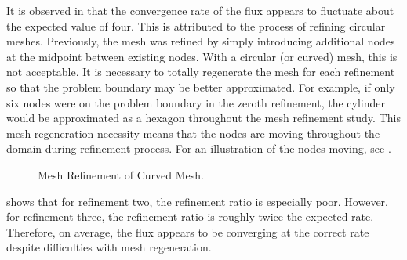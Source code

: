     It is observed in  that the convergence rate of the
    flux appears to fluctuate about the expected value of four. This is
    attributed to the process of refining circular meshes. Previously, the mesh
    was refined by simply introducing additional nodes at the midpoint between
    existing nodes. With a circular (or curved) mesh, this is not acceptable. It
    is necessary to totally regenerate the mesh for each refinement so that the
    problem boundary may be better approximated. For example, if only six nodes
    were on the problem boundary in the zeroth refinement, the cylinder would be
    approximated as a hexagon throughout the mesh refinement study. This mesh
    regeneration necessity means that the nodes are moving throughout the domain
    during refinement process. For an illustration of the nodes moving, see
    .

    \begin{figure}
      \centering
      \vspace{0.2in}
      \caption{Mesh Refinement of Curved Mesh.}
      \label{fig:ch03_circle_meshes}
    \end{figure}
    
     shows that for refinement two, the refinement ratio is
    especially poor. However, for refinement three, the refinement ratio is
    roughly twice the expected rate.  Therefore, on average, the flux appears to
    be converging at the correct rate despite difficulties with mesh
    regeneration.

